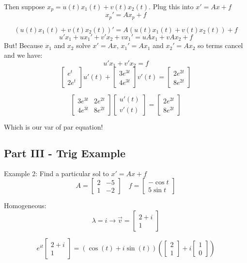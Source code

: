 \documentclass[12pt]{article}
\begin{document}
Then suppose $x_p = u(t) x_1 (t) + v(t) x_2(t)$. Plug this into $x' = Ax + f$
\[x_p' = Ax_p + f\]

\[(u(t) x_1 (t) + v(t) x_2(t))' = A(u(t) x_1 (t) + v(t) x_2(t)) + f\]
\[u' x_1 + ux_1' + v'x_2 + vx_1' = uAx_1 + vAx_2 + f\]
But! Because $x_1$ and $x_2$ solve $x' = Ax$, $x_1' = Ax_1$ and $x_2' = Ax_2$ so terms cancel and we have:
\[u' x_1 + v'x_2 = f\]
\[\begin{bmatrix}
    e^t\\
    2e^t
\end{bmatrix} u'(t) + \begin{bmatrix}
    3e^{3t}\\
    4e^{3t}
\end{bmatrix} v'(t) = \begin{bmatrix}
    2e^{2t}\\
    8e^{2t}
\end{bmatrix}\]

\[\begin{bmatrix}
    3e^{3t} & 2e^{2t}\\
    4e^{3t} & 8e^{2t}
\end{bmatrix} \begin{bmatrix}
    u'(t)\\
    v'(t)
\end{bmatrix} = \begin{bmatrix}
    2e^{2t}\\
    8e^{2t}
\end{bmatrix}\]

Which is our var of par equation! 

\subsection*{Part III - Trig Example}
Example 2: Find a particular sol to $x' = Ax + f$
\[A = \begin{bmatrix}
    2 & -5\\
    1 & -2
\end{bmatrix} \quad f = \begin{bmatrix}
    -\cos t\\
    5 \sin t
\end{bmatrix}\]

Homogeneous:
\[\lambda = i \longrightarrow \vec{v} = \begin{bmatrix}
    2 + i\\
    1
\end{bmatrix}\]

\[e^{it} \begin{bmatrix}
    2+i\\
    1
\end{bmatrix} = \left(\cos(t) + i \sin(t)\right)\left(\begin{bmatrix}
    2\\1
\end{bmatrix} + i\begin{bmatrix}
    1\\0
\end{bmatrix}\right)\]
\end{document}
